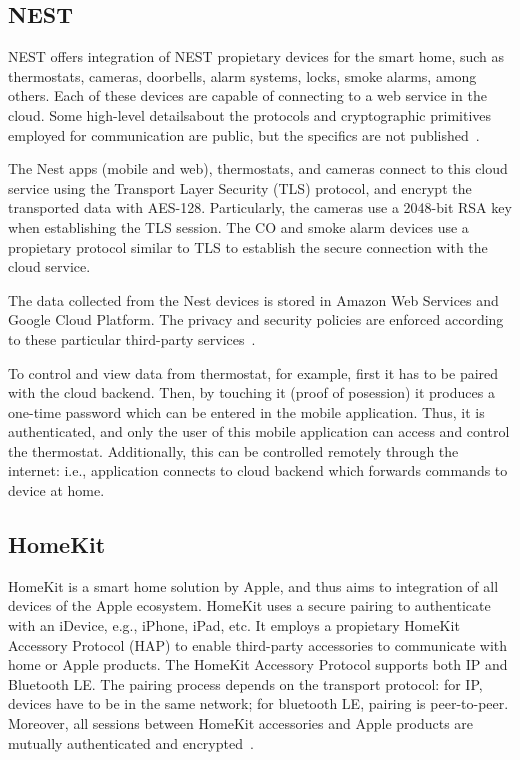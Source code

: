 \documentclass[12pt]{article}
\begin{document}
\subsection{NEST}
NEST offers integration of NEST propietary devices for the smart home, such as thermostats, cameras, doorbells, alarm systems, locks, smoke alarms, among others. Each of these devices are capable of connecting to a web service in the cloud. Some high-level detailsabout the protocols and cryptographic primitives employed for communication are public, but the specifics are not published~\cite{related_01}.

The Nest apps (mobile and web), thermostats, and cameras connect to this cloud service using the Transport Layer Security (TLS) protocol, and encrypt the transported data with AES-128. Particularly, the cameras use a 2048-bit RSA key when establishing the TLS session. The CO and smoke alarm devices use a propietary protocol similar to TLS to establish the secure connection with the cloud service.

The data collected from the Nest devices is stored in Amazon Web Services and Google Cloud Platform. The privacy and security policies are enforced according to these particular third-party services~\cite{related_01}.

To control and view data from thermostat, for example, first it has to be paired with the cloud backend. Then, by touching it (proof of posession) it produces a one-time password which can be entered in the mobile application. Thus, it is authenticated, and only the user of this mobile application can access and control the thermostat. Additionally, this can be controlled remotely through the internet: i.e., application connects to cloud backend which forwards commands to device at home.

\subsection{HomeKit}

HomeKit is a smart home solution by Apple, and thus aims to integration of all devices of the Apple ecosystem. HomeKit uses a secure pairing to authenticate with an iDevice, e.g., iPhone, iPad, etc. It employs a propietary HomeKit Accessory Protocol (HAP) to enable third-party accessories to communicate with home or Apple products. The HomeKit Accessory Protocol supports both IP and Bluetooth LE. The pairing process depends on the transport protocol: for IP, devices have to be in the same network; for bluetooth LE, pairing is peer-to-peer. Moreover, all sessions between HomeKit accessories and Apple products are mutually authenticated and encrypted~\cite{related_02}.
\end{document}
